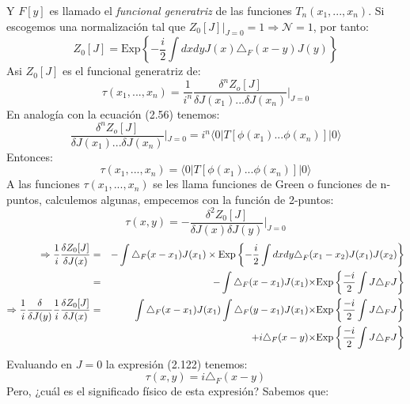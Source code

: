 Y $F[y]$ es llamado el \textit{funcional generatriz} de las funciones  $T_{n}(x_{1},...,x_{n})$. Si escogemos una normalización tal que $Z_0[J]|_{J=0}=1 \Rightarrow \mathcal{N}=1$, por tanto:
\begin{equation}
Z_{0}[J]=\text{Exp}\left\{ -\frac{i}{2}\int dxdyJ(x)\triangle_{F}(x-y)J(y)\right\} 
\end{equation}
Asi $Z_0[J]$ es el funcional generatriz de:
\begin{equation}
\tau(x_{1},...,x_{n})=\frac{1}{i^{n}}\frac{\delta^{n}Z_{o}[J]}{\delta J(x_{1})...\delta J(x_{n})}|_{J=0}
\end{equation}
En analogía con la ecuación (2.56) tenemos:
\begin{equation}
\frac{\delta^{n}Z_{o}[J]}{\delta J(x_{1})...\delta J(x_{n})}|_{J=0}=i^{n}\langle0|T[\phi(x_{1})...\phi(x_{n})]|0\rangle
\end{equation}
Entonces:
\begin{equation}
\tau(x_1,...,x_n)=\langle0|T[\phi(x_{1})...\phi(x_{n})]|0\rangle
\end{equation}
A las funciones $\tau(x_1,...,x_n)$ se les llama funciones de Green o funciones de n-puntos, calculemos algunas, empecemos con la función de 2-puntos:
\begin{equation}
\tau(x,y)=-\frac{\delta^2Z_0[J]}{\delta J(x)\delta J(y)}|_{J=0}
\end{equation}
\begin{eqnarray}
\nonumber \Rightarrow \frac{1}{i}\frac{\delta Z_{0}[J]}{\delta J(x)}&=&-\int\triangle_{F}(x-x_{1})J(x_{1})\times\text{Exp}\left\{ -\frac{i}{2}\int dxdy\text{\ensuremath{\triangle}}_{F}(x_{1}-x_{2})J(x_{1})J(x_{2})\right\}\\
\nonumber &=& -\int\triangle_{F}(x-x_{1})J(x_{1})\text{\ensuremath{\times}Exp}\left\{ \frac{-i}{2}\int J\triangle_{F}J\right\}\\ 
\nonumber \Rightarrow \frac{1}{i}\frac{\delta}{\delta J(y)}\frac{1}{i}\frac{\delta Z_{0}[J]}{\delta J(x)}&=&\int\triangle_{F}(x-x_{1})J(x_{1})\int\triangle_{F}(y-x_{1})J(x_{1})\text{\ensuremath{\times}Exp}\left\{ \frac{-i}{2}\int J\triangle_{F}J\right\}\\
&&+ i\triangle_{F}(x-y)\text{\ensuremath{\times}Exp}\left\{ \frac{-i}{2}\int J\triangle_{F}J\right\}
\end{eqnarray}
Evaluando en $J=0$ la expresión (2.122) tenemos:
\begin{equation}
\tau(x,y)=i\triangle_F(x-y)
\end{equation}
Pero, ¿cuál es el significado físico de esta expresión? Sabemos que:
